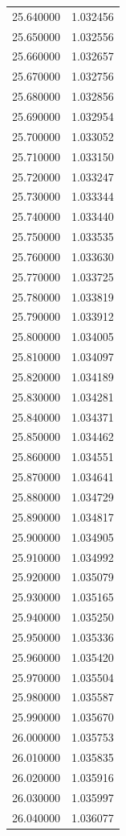 \begin{tabular}{rr}
25.640000 & 1.032456 \\
25.650000 & 1.032556 \\
25.660000 & 1.032657 \\
25.670000 & 1.032756 \\
25.680000 & 1.032856 \\
25.690000 & 1.032954 \\
25.700000 & 1.033052 \\
25.710000 & 1.033150 \\
25.720000 & 1.033247 \\
25.730000 & 1.033344 \\
25.740000 & 1.033440 \\
25.750000 & 1.033535 \\
25.760000 & 1.033630 \\
25.770000 & 1.033725 \\
25.780000 & 1.033819 \\
25.790000 & 1.033912 \\
25.800000 & 1.034005 \\
25.810000 & 1.034097 \\
25.820000 & 1.034189 \\
25.830000 & 1.034281 \\
25.840000 & 1.034371 \\
25.850000 & 1.034462 \\
25.860000 & 1.034551 \\
25.870000 & 1.034641 \\
25.880000 & 1.034729 \\
25.890000 & 1.034817 \\
25.900000 & 1.034905 \\
25.910000 & 1.034992 \\
25.920000 & 1.035079 \\
25.930000 & 1.035165 \\
25.940000 & 1.035250 \\
25.950000 & 1.035336 \\
25.960000 & 1.035420 \\
25.970000 & 1.035504 \\
25.980000 & 1.035587 \\
25.990000 & 1.035670 \\
26.000000 & 1.035753 \\
26.010000 & 1.035835 \\
26.020000 & 1.035916 \\
26.030000 & 1.035997 \\
26.040000 & 1.036077 \\

\end{tabular}
